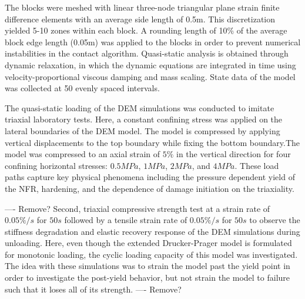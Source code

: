 The blocks were meshed with linear three-node triangular plane strain finite difference elements with an average side length of 0.5m. This discretization yielded 5-10 zones within each block. A rounding length of 10\% of the average block edge length (0.05m) was applied to the blocks in order to prevent numerical instabilities in the contact algorithm. Quasi-static analysis is obtained through dynamic relaxation, in which the dynamic equations are integrated in time using velocity-proportional viscous damping and mass scaling. State data of the model was collected at 50 evenly spaced intervals. 

The quasi-static loading of the DEM simulations was conducted to imitate triaxial laboratory tests. Here, a constant confining stress was applied on the lateral boundaries of the DEM model. The model is compressed by applying vertical  displacements to the top boundary while fixing the bottom boundary.The model was compressed to an axial strain of $5\%$ in the vertical direction for four confining horizontal stresses: $0.5MPa$, $1MPa$, $2MPa$, and $4MPa$. These load paths capture key physical phenomena including the pressure dependent yield of the NFR, hardening, and the dependence of damage initiation on the triaxiality. 

---- Remove? 
Second, triaxial compressive strength test at a strain rate of $0.05\%/s$ for $50s$ followed by a tensile strain rate of $0.05\%/s$ for $50s$ to observe the stiffness degradation and elastic recovery response of the DEM simulations during unloading. Here, even though the extended Drucker-Prager model is formulated for monotonic loading, the cyclic loading capacity of this model was investigated. The idea with these simulations was to strain the model past the yield point in order to investigate the post-yield behavior, but not strain the model to failure such that it loses all of its strength. ---- Remove? 

